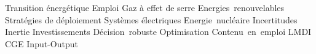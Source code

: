 
\noindent Transition énergétique \quad 
Emploi \quad
Gaz à effet de serre \quad
Energies~renouvelables \quad
Stratégies de déploiement \quad
Systèmes électriques \quad
Energie~nucléaire \quad
Incertitudes \quad
Inertie \quad
Investissements \quad
Décision~robuste \quad
Optimisation \quad
Contenu~en~emploi \quad
LMDI \quad
CGE \quad
Input-Output \quad


